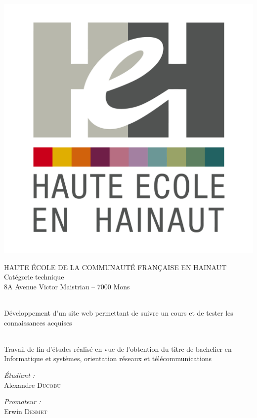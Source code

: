 \begin{center}
  \includegraphics[scale=0.12]{textures/logo/heh.pdf}

  \vspace{0.5cm}

  HAUTE ÉCOLE DE LA COMMUNAUTÉ FRANÇAISE EN HAINAUT \\
  Catégorie technique \\
  8A Avenue Victor Maistriau – 7000 Mons \\ [0.5cm]

  \begingroup
   \selectfont 

  \HRule \\ [0.4cm] {
    \huge Développement d'un site web permettant de suivre un cours et de tester les connaissances acquises \\ [0.2cm] 
  }
  \HRule \\ [0.3cm]
  \endgroup
  
  Travail de fin d'études réalisé en vue de l'obtention du titre de bachelier en Informatique et systèmes, orientation réseaux et télécommunications \\ [1cm]
  
  \begin{minipage}[t]{0.4 \textwidth} 
    \begin{flushleft} 
      \large \emph{Étudiant :} \\ 
      Alexandre \textsc{Ducobu}
    \end{flushleft} 
  \end{minipage}
  \begin{minipage}[t]{0.4 \textwidth}
    \begin{flushright} 
      \large \emph{Promoteur :} \\ 
      Erwin \textsc{Desmet}
    \end{flushright} 
  \end{minipage}


\end{center}
